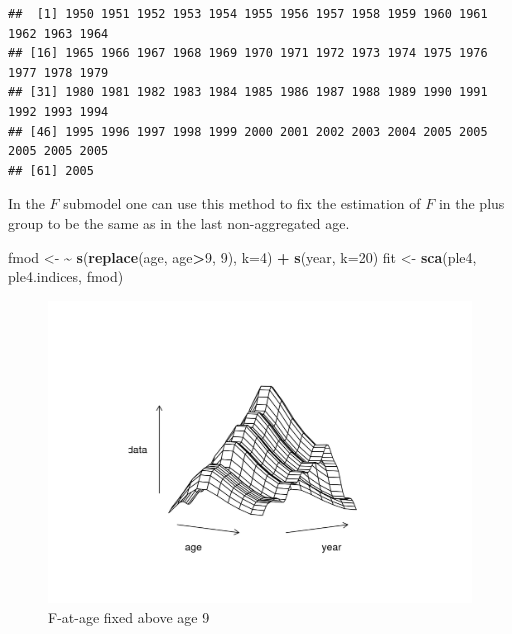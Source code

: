\documentclass[
]{book}
\newenvironment{Shaded}{\begin{snugshade}}{\end{snugshade}}
\newcommand{\AttributeTok}[1]{\textcolor[rgb]{0.13,0.29,0.53}{#1}}
\newcommand{\DecValTok}[1]{\textcolor[rgb]{0.00,0.00,0.81}{#1}}
\newcommand{\ErrorTok}[1]{\textcolor[rgb]{0.64,0.00,0.00}{\textbf{#1}}}
\newcommand{\FunctionTok}[1]{\textcolor[rgb]{0.13,0.29,0.53}{\textbf{#1}}}
\newcommand{\NormalTok}[1]{#1}
\newcommand{\OtherTok}[1]{\textcolor[rgb]{0.56,0.35,0.01}{#1}}
\newcommand{\SpecialCharTok}[1]{\textcolor[rgb]{0.81,0.36,0.00}{\textbf{#1}}}
\begin{document}
\begin{verbatim}
##  [1] 1950 1951 1952 1953 1954 1955 1956 1957 1958 1959 1960 1961 1962 1963 1964
## [16] 1965 1966 1967 1968 1969 1970 1971 1972 1973 1974 1975 1976 1977 1978 1979
## [31] 1980 1981 1982 1983 1984 1985 1986 1987 1988 1989 1990 1991 1992 1993 1994
## [46] 1995 1996 1997 1998 1999 2000 2001 2002 2003 2004 2005 2005 2005 2005 2005
## [61] 2005
\end{verbatim}

In the \(F\) submodel one can use this method to fix the estimation of \(F\) in the plus group to be the same as in the last non-aggregated age.

\begin{Shaded}
\begin{Highlighting}[]
\NormalTok{fmod }\OtherTok{\textless{}{-}} \ErrorTok{\textasciitilde{}} \FunctionTok{s}\NormalTok{(}\FunctionTok{replace}\NormalTok{(age, age}\SpecialCharTok{\textgreater{}}\DecValTok{9}\NormalTok{, }\DecValTok{9}\NormalTok{), }\AttributeTok{k=}\DecValTok{4}\NormalTok{) }\SpecialCharTok{+} \FunctionTok{s}\NormalTok{(year, }\AttributeTok{k=}\DecValTok{20}\NormalTok{)}
\NormalTok{fit }\OtherTok{\textless{}{-}} \FunctionTok{sca}\NormalTok{(ple4, ple4.indices, fmod)}
\end{Highlighting}
\end{Shaded}

\begin{figure}
\centering
\includegraphics{_bookdown_files/_main_files/figure-html/ctsselage-1.png}
\caption{\label{fig:ctsselage}F-at-age fixed above age 9}
\end{figure}
\end{document}
